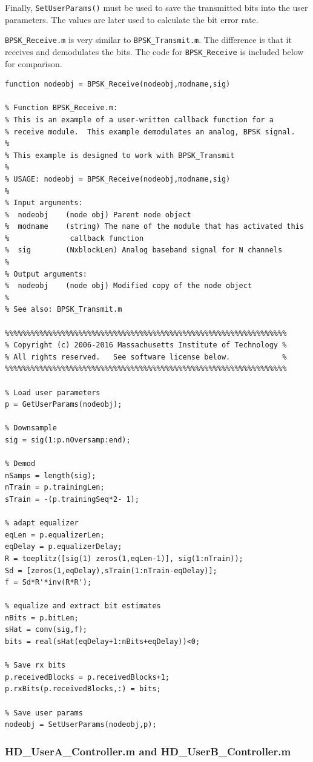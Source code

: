 Finally, \verb+SetUserParams()+ must be used to save the transmitted
bits into the user parameters.  The values are later used to
calculate the bit error rate.

\verb+BPSK_Receive.m+ is very similar to \verb+BPSK_Transmit.m+. The
difference is that it receives and demodulates the bits.  The code
for \verb+BPSK_Receive+ is included below for comparison.

\begin{lstlisting}[name=bpskRx]
function nodeobj = BPSK_Receive(nodeobj,modname,sig)

% Function BPSK_Receive.m:
% This is an example of a user-written callback function for a 
% receive module.  This example demodulates an analog, BPSK signal.
%
% This example is designed to work with BPSK_Transmit
%
% USAGE: nodeobj = BPSK_Receive(nodeobj,modname,sig)
%
% Input arguments:
%  nodeobj    (node obj) Parent node object
%  modname    (string) The name of the module that has activated this
%              callback function
%  sig        (NxblockLen) Analog baseband signal for N channels
%
% Output arguments:
%  nodeobj    (node obj) Modified copy of the node object
%
% See also: BPSK_Transmit.m

%%%%%%%%%%%%%%%%%%%%%%%%%%%%%%%%%%%%%%%%%%%%%%%%%%%%%%%%%%%%%%%%%
% Copyright (c) 2006-2016 Massachusetts Institute of Technology %
% All rights reserved.   See software license below.            %
%%%%%%%%%%%%%%%%%%%%%%%%%%%%%%%%%%%%%%%%%%%%%%%%%%%%%%%%%%%%%%%%%

% Load user parameters
p = GetUserParams(nodeobj);

% Downsample
sig = sig(1:p.nOversamp:end);

% Demod
nSamps = length(sig);
nTrain = p.trainingLen;
sTrain = -(p.trainingSeq*2- 1);

% adapt equalizer
eqLen = p.equalizerLen;
eqDelay = p.equalizerDelay;
R = toeplitz([sig(1) zeros(1,eqLen-1)], sig(1:nTrain));
Sd = [zeros(1,eqDelay),sTrain(1:nTrain-eqDelay)];
f = Sd*R'*inv(R*R');

% equalize and extract bit estimates 
nBits = p.bitLen;
sHat = conv(sig,f);
bits = real(sHat(eqDelay+1:nBits+eqDelay))<0;

% Save rx bits
p.receivedBlocks = p.receivedBlocks+1;
p.rxBits(p.receivedBlocks,:) = bits;

% Save user params
nodeobj = SetUserParams(nodeobj,p);
\end{lstlisting}

\subsubsection{HD\_UserA\_Controller.m and HD\_UserB\_Controller.m}

